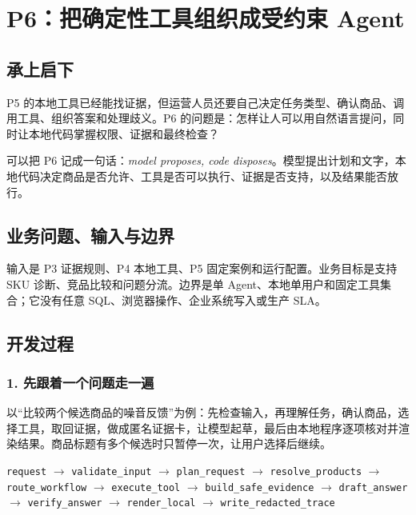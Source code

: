 \chapter{P6：把确定性工具组织成受约束 Agent}

\section{承上启下}

P5 的本地工具已经能找证据，但运营人员还要自己决定任务类型、确认商品、调用工具、组织答案和处理歧义。P6 的问题是：怎样让人可以用自然语言提问，同时让本地代码掌握权限、证据和最终检查？

\begin{factbox}
可以把 P6 记成一句话：\textit{model proposes, code disposes}。模型提出计划和文字，本地代码决定商品是否允许、工具是否可以执行、证据是否支持，以及结果能否放行。
\end{factbox}

\section{业务问题、输入与边界}

输入是 P3 证据规则、P4 本地工具、P5 固定案例和运行配置。业务目标是支持 SKU 诊断、竞品比较和问题分流。边界是单 Agent、本地单用户和固定工具集合；它没有任意 SQL、浏览器操作、企业系统写入或生产 SLA。

\section{开发过程}

\subsection{1. 先跟着一个问题走一遍}

以“比较两个候选商品的噪音反馈”为例：先检查输入，再理解任务，确认商品，选择工具，取回证据，做成匿名证据卡，让模型起草，最后由本地程序逐项核对并渲染结果。商品标题有多个候选时只暂停一次，让用户选择后继续。

\begin{center}
\texttt{request}
$\rightarrow$ \texttt{validate\_input}
$\rightarrow$ \texttt{plan\_request}
$\rightarrow$ \texttt{resolve\_products}
$\rightarrow$ \texttt{route\_workflow}
$\rightarrow$ \texttt{execute\_tool}
$\rightarrow$ \texttt{build\_safe\_evidence}
$\rightarrow$ \texttt{draft\_answer}
$\rightarrow$ \texttt{verify\_answer}
$\rightarrow$ \texttt{render\_local}
$\rightarrow$ \texttt{write\_redacted\_trace}
\end{center}

